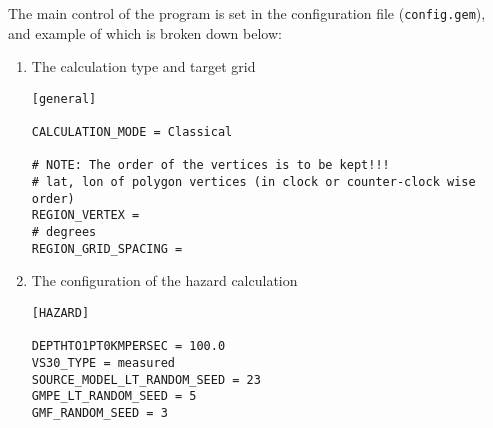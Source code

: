 The main control of the program is set in the configuration file 
(\verb=config.gem=), and example of which is broken down below:

\begin{enumerate}
\item The calculation type and target grid
\begin{Verbatim}[frame=single, commandchars=\\\{\}, fontsize=\small]
[general]

CALCULATION_MODE = Classical

# NOTE: The order of the vertices is to be kept!!!
# lat, lon of polygon vertices (in clock or counter-clock wise order)
REGION_VERTEX = 
# degrees
REGION_GRID_SPACING = 
\end{Verbatim}
%
\item The configuration of the hazard calculation
\begin{Verbatim}[frame=single, commandchars=\\\{\}, fontsize=\small]
[HAZARD]

DEPTHTO1PT0KMPERSEC = 100.0
VS30_TYPE = measured
SOURCE_MODEL_LT_RANDOM_SEED = 23
GMPE_LT_RANDOM_SEED = 5
GMF_RANDOM_SEED = 3


\end{Verbatim}
\end{enumerate}
